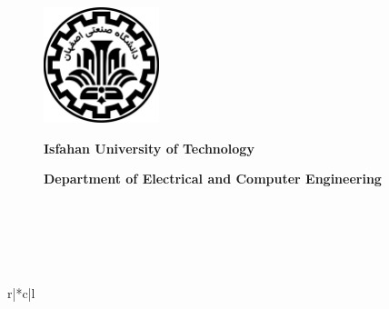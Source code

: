 { \centering
\begin{figure}[ht]
	\centering
	\includegraphics[width=0.3\textwidth]{IUT Logo.png}
	\caption*{\textbf{Isfahan University of Technology}}
	\caption*{\textbf{Department of Electrical and Computer Engineering}}
	\label{fig:fig1}
\end{figure}

    
    \vskip 0.2cm
    
    {{\bf \large \asshl{\mbox{\coursename}}}}\\
    
    {{\bf \large \asshl{\mbox{\Proname}}}}\\
	{{\bf \large \asshl{\mbox{\TAname}}}}\\
	{{\bf \large \asshl{\mbox{\Subdate}}}}\\
	{{\bf \large \asshl{\mbox{\Duedate}}}}

    \def\authorstabledata{} 
    \foreachitem\z\in\authors[]{%
        \edef\tabline{\z}
        \expandafter\addto\expandafter\authorstabledata\expandafter{\tabline \\}
    }
    
    \setlength\arrayrulewidth{3pt}
    \begin{table}[H] \centering 
    \begin{tabular}{r|*{\the\numexpr{}\relax}{c|}l}
    
        \authorstabledata
    
    \end{tabular}
    \end{table}
}